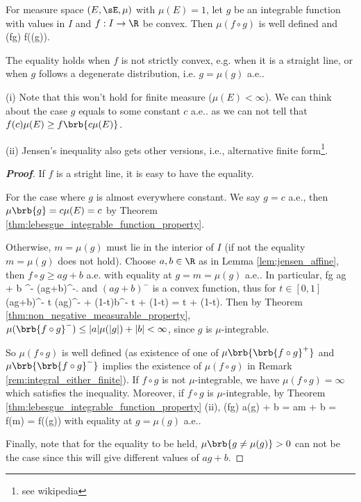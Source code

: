 \begin{theorem}\label{thm:jensen_inequality_measure}
For measure space $(E,\sE,\mu)$ with $\mu(E) =1$, let $g$ be an integrable function with values in $I$ and $f : I \to \R$ be convex. Then $\mu(f\circ g)$ is well defined and
\be
\mu(f\circ g) \geq f(\mu(g)).
\ee

The equality holds when $f$ is not strictly convex, e.g. when it is a straight line, or when $g$ follows a degenerate distribution, i.e. $g = \mu(g)$ a.e..
\end{theorem}

\begin{remark}
\ben
\item [(i)] Note that this won't hold for finite measure ($\mu(E)< \infty$). We can think about the case $g$ equals to some constant $c$ a.e.. as we can not tell that $f(c)\mu(E) \geq f\brb{c\mu(E)}$.

\item [(ii)] Jensen's inequality also gets other versions, i.e., alternative finite form\footnote{see wikipedia}.
\een
\end{remark}

\begin{proof}[\bf Proof]
If $f$ is a stright line, it is easy to have the equality.

For the case where $g$ is almost everywhere constant. We say $g=c$ a.e., then $\mu\brb{g}=c\mu(E) =c$ by Theorem \ref{thm:lebesgue_integrable_function_property}.

Otherwise, $m = \mu(g)$ must lie in the interior of $I$ (if not the equality $m = \mu(g)$ does not hold). Choose $a, b \in \R$ as in Lemma \ref{lem:jensen_affine}, then $f\circ g \geq ag + b$ a.e. with equality at $g = m = \mu(g)$ a.e.. In particular,
\be
f\circ g \geq ag + b \quad\ra\quad {}^- \leq (ag+b)^-.
\ee
and $(ag+b)^-$ is a convex function, thus for $t\in [0,1]$
\be
(ag+b)^- \leq t (ag)^- + (1-t)b^- \leq t + (1-t) = t  + (1-t).
\ee
Then by Theorem \ref{thm:non_negative_measurable_property}, $\mu(\brb{f\circ g}^-) \leq |a|\mu(|g|) + |b| < \infty$, since $g$ is $\mu$-integrable.

So $\mu(f\circ g)$ is well defined (as existence of one of $\mu\brb{\brb{f\circ g}^+}$ and $\mu\brb{\brb{f\circ g}^-}$ implies the existence of $\mu(f\circ g)$ in Remark \ref{rem:integral_either_finite}). If $f\circ g$ is not $\mu$-integrable, we have $\mu(f\circ g) = \infty$ which satisfies the inequality. Moreover, if $f\circ g$ is $\mu$-integrable, by Theorem \ref{thm:lebesgue_integrable_function_property} (ii),
\be
\mu(f\circ g) \geq a\mu(g) + b = am + b = f(m) = f(\mu(g))
\ee
with equality at $g = \mu(g)$ a.e..

Finally, note that for the equality to be held, $\mu\brb{g \neq \mu(g)} >0$ can not be the case since this will give different values of $ag +b$.
\end{proof}

